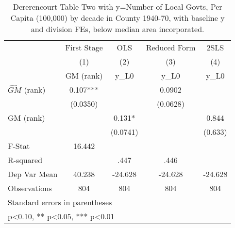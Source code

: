 \begin{table}[htbp]\centering
\def\sym#1{\ifmmode^{#1}\else\(^{#1}\)\fi}
\caption{Dererencourt Table Two with y=Number of Local Govts, Per Capita (100,000) by decade in County 1940-70, with baseline y and division FEs, below median area incorporated.}
\begin{tabular}{l*{4}{c}}
\toprule
                    & First Stage   &         OLS   &Reduced Form   &        2SLS   \\
                    &\multicolumn{1}{c}{(1)}&\multicolumn{1}{c}{(2)}&\multicolumn{1}{c}{(3)}&\multicolumn{1}{c}{(4)}\\
                    &\multicolumn{1}{c}{GM  (rank)}&\multicolumn{1}{c}{y\_L0}&\multicolumn{1}{c}{y\_L0}&\multicolumn{1}{c}{y\_L0}\\
\midrule
$\hat{GM}$ (rank)   &       0.107***&               &      0.0902   &               \\
                    &    (0.0350)   &               &    (0.0628)   &               \\
\addlinespace
GM  (rank)          &               &       0.131*  &               &       0.844   \\
                    &               &    (0.0741)   &               &     (0.633)   \\
\midrule
F-Stat              &      16.442   &               &               &               \\
R-squared           &               &        .447   &        .446   &               \\
Dep Var Mean        &      40.238   &     -24.628   &     -24.628   &     -24.628   \\
Observations        &         804   &         804   &         804   &         804   \\
\bottomrule
\multicolumn{5}{l}{\footnotesize Standard errors in parentheses}\\
\multicolumn{5}{l}{\footnotesize * p<0.10, ** p<0.05, *** p<0.01}\\
\end{tabular}
\end{table}
